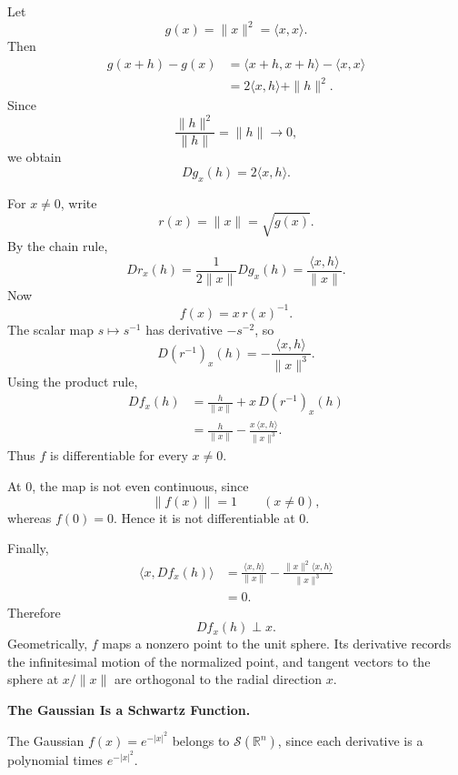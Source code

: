 \begin{solution}
Let
\[
g(x)=\|x\|^2=\langle x,x\rangle.
\]
Then
\[
\begin{aligned}
g(x+h)-g(x)
&=
\langle x+h,x+h\rangle-\langle x,x\rangle\\
&=
2\langle x,h\rangle+\|h\|^2.
\end{aligned}
\]
Since
\[
\frac{\|h\|^2}{\|h\|}
=
\|h\|\to0,
\]
we obtain
\[
\boxed{
Dg_x(h)=2\langle x,h\rangle.
}
\]

For \(x\neq0\), write
\[
r(x)=\|x\|=\sqrt{g(x)}.
\]
By the chain rule,
\[
Dr_x(h)
=
\frac1{2\|x\|}Dg_x(h)
=
\frac{\langle x,h\rangle}{\|x\|}.
\]
Now
\[
f(x)=x\,r(x)^{-1}.
\]
The scalar map \(s\mapsto s^{-1}\) has derivative \(-s^{-2}\), so
\[
D(r^{-1})_x(h)
=
-\frac{\langle x,h\rangle}{\|x\|^3}.
\]
Using the product rule,
\[
\begin{aligned}
Df_x(h)
&=
\frac{h}{\|x\|}
+
x\,D(r^{-1})_x(h)\\
&=
\boxed{
\frac{h}{\|x\|}
-
\frac{x\,\langle x,h\rangle}{\|x\|^3}
}.
\end{aligned}
\]
Thus \(f\) is differentiable for every \(x\neq0\).

At \(0\), the map is not even continuous, since
\[
\|f(x)\|=1
\qquad(x\neq0),
\]
whereas \(f(0)=0\). Hence it is not differentiable at \(0\).

Finally,
\[
\begin{aligned}
\langle x,Df_x(h)\rangle
&=
\frac{\langle x,h\rangle}{\|x\|}
-
\frac{\|x\|^2\langle x,h\rangle}{\|x\|^3}\\
&=0.
\end{aligned}
\]
Therefore
\[
\boxed{Df_x(h)\perp x.}
\]
Geometrically, \(f\) maps a nonzero point to the unit sphere. Its derivative records the
infinitesimal motion of the normalized point, and tangent vectors to the sphere at
\(x/\|x\|\) are orthogonal to the radial direction \(x\).
\end{solution}


\begin{problem}[CP-II-0055]
\label{prob:cp-ii-0055}
\textbf{The Gaussian Is a Schwartz Function.}

\hspace*{1.5em}The Gaussian $f(x)=e^{-|x|^2}$ belongs to $\mathcal{S}(\mathbb{R}^n)$,
	since each derivative is a polynomial times $e^{-|x|^2}$.
\end{problem}

